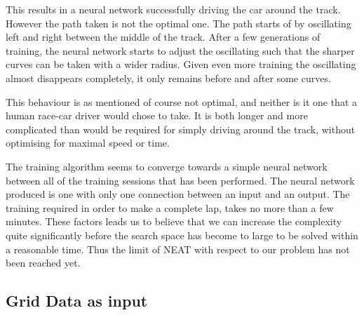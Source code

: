 This results in a neural network successfully driving the car around the track. However the path taken is not the optimal one. The path starts of by oscillating left and right between the middle of the track. After a few generations of training, the neural network starts to adjust the oscillating such that the sharper curves can be taken with a wider radius. Given even more training the oscillating almost disappears completely, it only remains before and after some curves.

This behaviour is as mentioned of course not optimal, and neither is it one that a human race-car driver would chose to take. It is both longer and more complicated than would be required for simply driving around the track, without optimising for maximal speed or time.

The training algorithm seems to converge towards a simple neural network between all of the training sessions that has been performed. The neural network produced is one with only one connection between an input and an output. The training required in order to make a complete lap, takes no more than a few minutes. These factors leads us to believe that we can increase the complexity quite significantly before the search space has become to large to be solved within a reasonable time. Thus the limit of NEAT with respect to our problem has not been reached yet.


\subsection{Grid Data as input}

\fi